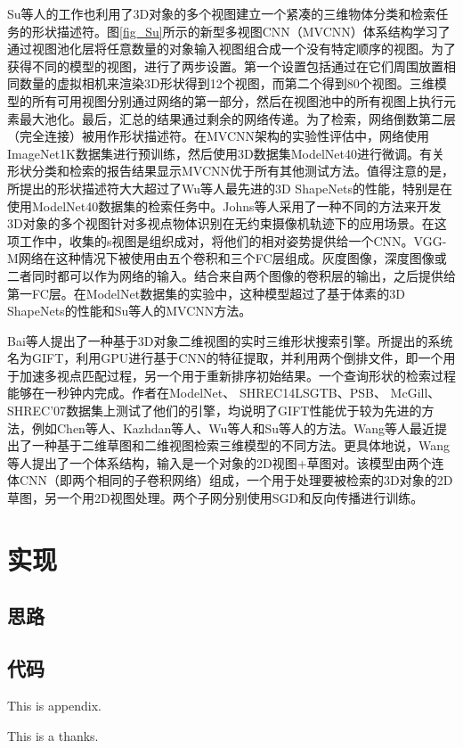 \documentclass[twoside,UTF8]{nputhesis}
\begin{document}
Su等人\cite{}的工作也利用了3D对象的多个视图建立一个紧凑的三维物体分类和检索任务的形状描述符。图\ref{fig_Su}所示的新型多视图CNN（MVCNN）体系结构学习了通过视图池化层将任意数量的对象输入视图组合成一个没有特定顺序的视图。为了获得不同的模型的视图，进行了两步设置。第一个设置包括通过在它们周围放置相同数量的虚拟相机来渲染3D形状得到12个视图，而第二个得到80个视图。三维模型的所有可用视图分别通过网络的第一部分，然后在视图池中的所有视图上执行元素最大池化。最后，汇总的结果通过剩余的网络传递。为了检索，网络倒数第二层（完全连接）被用作形状描述符。在MVCNN架构的实验性评估中，网络使用ImageNet1K数据集进行预训练，然后使用3D数据集ModelNet40进行微调。有关形状分类和检索的报告结果显示MVCNN优于所有其他测试方法。值得注意的是，所提出的形状描述符大大超过了Wu等人最先进的3D ShapeNets的性能，特别是在使用ModelNet40数据集的检索任务中。Johns等人\cite{}采用了一种不同的方法来开发3D对象的多个视图针对多视点物体识别在无约束摄像机轨迹下的应用场景。在这项工作中，收集的s视图是组织成对，将他们的相对姿势提供给一个CNN。VGG-M网络\cite{}在这种情况下被使用由五个卷积和三个FC层组成。灰度图像，深度图像或二者同时都可以作为网络的输入。结合来自两个图像的卷积层的输出，之后提供给第一FC层。在ModelNet数据集\cite{}的实验中，这种模型超过了基于体素的3D ShapeNets的性能和Su等人的MVCNN方法。

Bai等人\cite{}提出了一种基于3D对象二维视图的实时三维形状搜索引擎。所提出的系统名为GIFT，利用GPU进行基于CNN的特征提取，并利用两个倒排文件，即一个用于加速多视点匹配过程，另一个用于重新排序初始结果。一个查询形状的检索过程能够在一秒钟内完成。作者在ModelNet、 SHREC14LSGTB\cite{}、PSB、 McGill\cite{}、SHREC'07\cite{}数据集上测试了他们的引擎，均说明了GIFT性能优于较为先进的方法，例如Chen等人\cite{}、Kazhdan等人\cite{}、Wu等人\cite{}和Su等人\cite{}的方法。Wang等人\cite{}最近提出了一种基于二维草图和二维视图检索三维模型的不同方法。更具体地说，Wang等人提出了一个体系结构，输入是一个对象的{2D视图+草图}对。该模型由两个连体CNN（即两个相同的子卷积网络）组成，一个用于处理要被检索的3D对象的2D草图，另一个用2D视图处理。两个子网分别使用SGD和反向传播进行训练。









\chapter{实现}

\section{思路}
\section{代码}


\backmatter



\Appendix
This is appendix.

\Thanks
This is a thanks.

\Work

\statement
\end{document}
